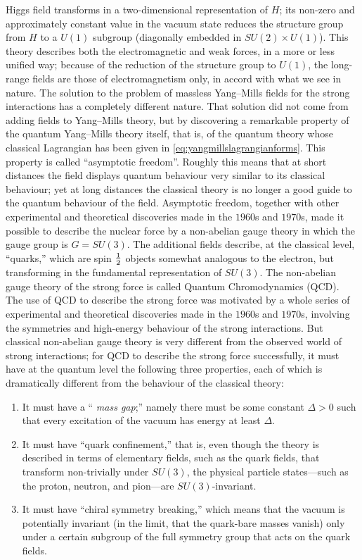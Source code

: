  Higgs field transforms in a two-dimensional representation of $H$; its non-zero and
 approximately constant value in the vacuum state reduces the structure group from
 $H$ to a $U (1)$ subgroup (diagonally embedded in $SU (2) \times U (1)$). This theory describes both the electromagnetic and weak forces, in a more or less unified way;
 because of the reduction of the structure group to $U (1)$, the long-range fields are
 those of electromagnetism only, in accord with what we see in nature.
 The solution to the problem of massless Yang–Mills fields for the strong interactions has a completely different nature. That solution did not come from
 adding fields to Yang–Mills theory, but by discovering a remarkable property of the
 quantum Yang–Mills theory itself, that is, of the quantum theory whose classical
 Lagrangian has been given in \ref{eq:yangmillslagrangianforms}. This property is called “asymptotic freedom”. Roughly this means that at short distances the field displays quantum
 behaviour very similar to its classical behaviour; yet at long distances the classical
 theory is no longer a good guide to the quantum behaviour of the field.
 Asymptotic freedom, together with other experimental and theoretical discoveries made in the $1960$s and $1970$s, made it possible to describe the nuclear force by a non-abelian gauge theory in which the gauge group is $G = SU (3)$. The additional fields describe, at the classical level, “quarks,” which are spin $\frac{1}{2}$ objects
 somewhat analogous to the electron, but transforming in the fundamental representation of $SU (3)$. The non-abelian gauge theory of the strong force is called
 Quantum Chromodynamics (QCD).\\
 The use of QCD to describe the strong force was motivated by a whole series of
 experimental and theoretical discoveries made in the $1960$s and $1970$s, involving the
 symmetries and high-energy behaviour of the strong interactions. But classical non-abelian gauge theory is very different from the observed world of strong interactions;
 for QCD to describe the strong force successfully, it must have at the quantum
 level the following three properties, each of which is dramatically different from the
 behaviour of the classical theory:
 \begin{enumerate} 
 \item  It must have a “ \emph{mass gap};” namely there must be some constant $\Delta  > 0$
 such that every excitation of the vacuum has energy at least $\Delta$.
 \item It must have “quark confinement,” that is, even though the theory is described in terms of elementary fields, such as the quark fields, that transform
 non-trivially under $SU (3)$, the physical particle states—such as the proton,
 neutron, and pion—are $SU (3)$-invariant.
 \item  It must have “chiral symmetry breaking,” which means that the vacuum is
 potentially invariant (in the limit, that the quark-bare masses vanish) only
 under a certain subgroup of the full symmetry group that acts on the quark
 fields.
\end{enumerate}
